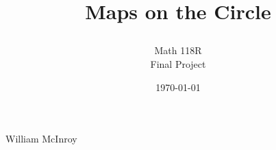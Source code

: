 \documentclass[11pt]{amsart}
\title{Maps on the Circle\subtitle{Math 118R\\Final Project}}
\date{\today}
\DeclareRobustCommand{\subtitle}[1]{\\#1}
\begin{document}
\maketitle
\renewcommand{\subtitle}[1]{}

\vspace*{-0.25in}
\centerline{William McInroy}
\centerline{\href{mailto:}
                 {{\tt }}}
\vspace*{-0.2in}

\begin{abstract}
\end{abstract}
\vspace*{-0.75em}

\tableofcontents
\vspace*{-0.5in}


\renewcommand*{\bibfont}{\footnotesize}
\printbibliography
\end{document}

